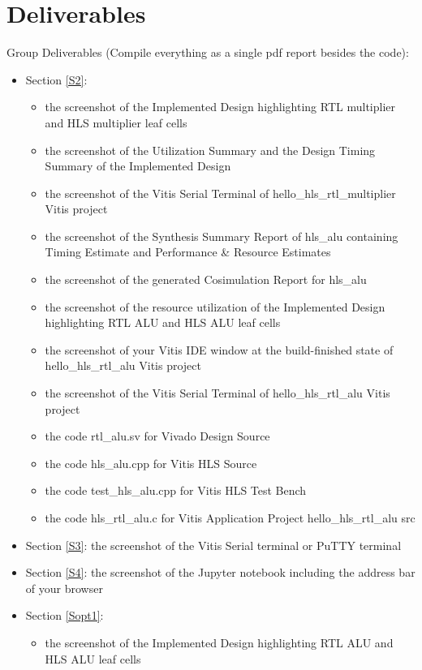 \documentclass[a4paper,12pt,twoside]{article}
\begin{document}
\newpage
\section{Deliverables}
Group Deliverables (Compile everything as a single pdf report besides the code):
\begin{itemize}
    \item Section \ref{S2}:
    \begin{itemize}
        \item the screenshot of the Implemented Design highlighting RTL multiplier and HLS multiplier leaf cells
        \item the screenshot of the Utilization Summary and the Design Timing Summary of the Implemented Design
        \item the screenshot of the Vitis Serial Terminal of hello\_hls\_rtl\_multiplier Vitis project
        \item the screenshot of the Synthesis Summary Report of hls\_alu containing Timing Estimate and Performance \& Resource Estimates
        \item the screenshot of the generated Cosimulation Report for hls\_alu
        \item the screenshot of the resource utilization of the Implemented Design highlighting RTL ALU and HLS ALU leaf cells
        \item the screenshot of your Vitis IDE window at the build-finished state of hello\_hls\_rtl\_alu Vitis project
        \item the screenshot of the Vitis Serial Terminal of hello\_hls\_rtl\_alu Vitis project
        \item the code rtl\_alu.sv for Vivado Design Source
        \item the code hls\_alu.cpp for Vitis HLS Source
        \item the code test\_hls\_alu.cpp for Vitis HLS Test Bench
        \item the code hls\_rtl\_alu.c for Vitis Application Project hello\_hls\_rtl\_alu src
    \end{itemize}
    \item Section \ref{S3}: the screenshot of the Vitis Serial terminal or PuTTY terminal
    \item Section \ref{S4}: the screenshot of the Jupyter notebook including the address bar of your browser
    \item Section \ref{Sopt1}:
    \begin{itemize}
        \item the screenshot of the Implemented Design highlighting RTL ALU and HLS ALU leaf cells

\end{itemize}
\end{itemize}
\end{document}
